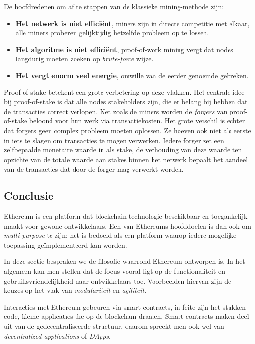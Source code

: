 		De hoofdredenen om af te stappen van de klassieke mining-methode zijn:
		\begin{itemize}
			\item \textbf{Het netwerk is niet efficiënt}, miners zijn in directe competitie met elkaar, alle miners proberen gelijktijdig hetzelfde probleem op te lossen.
			\item \textbf{Het algoritme is niet efficiënt}, proof-of-work mining vergt dat nodes langdurig moeten zoeken op \textit{brute-force} wijze. 
			\item \textbf{Het vergt enorm veel energie}, omwille van de eerder genoemde gebreken.
		\end{itemize}
		 Proof-of-stake betekent een grote verbetering op deze vlakken. Het centrale idee bij proof-of-stake is dat alle nodes stakeholders zijn, die er belang bij hebben dat de transacties correct verlopen. Net zoals de miners worden de \textit{forgers} van proof-of-stake beloond voor hun werk via transactiekosten. Het grote verschil is echter dat forgers geen complex probleem moeten oplossen. Ze hoeven ook niet als eerste in iets te slagen om transacties te mogen verwerken. Iedere forger zet een zelfbepaalde monetaire waarde in als stake, de verhouding van deze waarde ten opzichte van de totale waarde aan stakes binnen het netwerk bepaalt het aandeel van de transacties dat door de forger mag verwerkt worden.
	\subsection{Conclusie}
		 Ethereum is een platform dat blockchain-technologie beschikbaar en toegankelijk maakt voor gewone ontwikkelaars. Een van Ethereums hoofddoelen is dan ook om \textit{multi-purpose} te zijn: het is bedoeld als een platform waarop iedere mogelijke toepassing geïmplementeerd kan worden. ~\autocite{Buterin2014}
		 
		 In deze sectie bespraken we de filosofie waarrond Ethereum ontworpen is. In het algemeen kan men stellen dat de focus vooral ligt op de functionaliteit en gebruiksvriendelijkheid naar ontwikkelaars toe. Voorbeelden hiervan zijn de keuzes op het vlak van \textit{modulariteit} en \textit{agiliteit}. ~\autocite{Buterin2014}
		 
		 Interacties met Ethereum gebeuren via smart contracts, in feite zijn het stukken code, kleine applicaties die op de blockchain draaien. Smart-contracts maken deel uit van de gedecentraliseerde structuur, daarom spreekt men ook wel van \textit{decentralized applications} of \textit{DApps}. ~\autocite{McCubin2019}
		 
